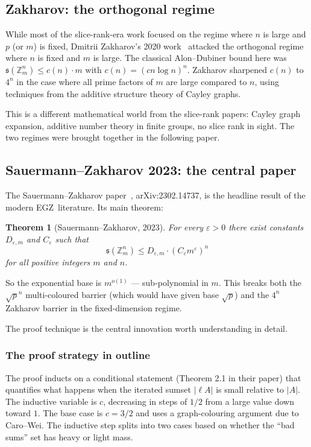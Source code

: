 \documentclass[11pt,a4paper]{article}
\theoremstyle{plain}
\newtheorem{theorem}{Theorem}[section]
\theoremstyle{definition}
\theoremstyle{remark}
\newcommand{\Z}{\mathbb{Z}}
\newcommand{\sUFp}{\mathfrak{s}}
\newcommand{\EGZ}{\textsf{EGZ}}
\begin{document}
\subsection{Zakharov: the orthogonal regime}

While most of the slice-rank-era work focused on the regime where $n$ is large and $p$ (or $m$) is fixed, Dmitrii Zakharov's 2020 work~\cite{zakharov2020} attacked the orthogonal regime where $n$ is fixed and $m$ is large. The classical Alon--Dubiner bound here was $\sUFp(\Z_m^n) \leq c(n) \cdot m$ with $c(n) = (cn \log n)^n$. Zakharov sharpened $c(n)$ to $4^n$ in the case where all prime factors of $m$ are large compared to $n$, using techniques from the additive structure theory of Cayley graphs.

This is a different mathematical world from the slice-rank papers: Cayley graph expansion, additive number theory in finite groups, no slice rank in sight. The two regimes were brought together in the following paper.

\subsection{Sauermann--Zakharov 2023: the central paper}\label{sec:sauermann-zakharov}

The Sauermann--Zakharov paper~\cite{sauermannzakharov2023}, arXiv:2302.14737, is the headline result of the modern \EGZ\ literature. Its main theorem:

\begin{theorem}[Sauermann--Zakharov, 2023]
For every $\varepsilon > 0$ there exist constants $D_{\varepsilon, m}$ and $C_\varepsilon$ such that
\[
\sUFp(\Z_m^n) \leq D_{\varepsilon, m} \cdot (C_\varepsilon m^\varepsilon)^n
\]
for all positive integers $m$ and $n$.
\end{theorem}

So the exponential base is $m^{o(1)}$ --- sub-polynomial in $m$. This breaks both the $\sqrt{p}^n$ multi-coloured barrier (which would have given base $\sqrt{p}$) and the $4^n$ Zakharov barrier in the fixed-dimension regime.

The proof technique is the central innovation worth understanding in detail.

\subsubsection{The proof strategy in outline}

The proof inducts on a conditional statement (Theorem 2.1 in their paper) that quantifies what happens when the iterated sumset $|\ell A|$ is small relative to $|A|$. The inductive variable is $c$, decreasing in steps of $1/2$ from a large value down toward $1$. The base case is $c = 3/2$ and uses a graph-colouring argument due to Caro--Wei. The inductive step splits into two cases based on whether the ``bad sums'' set has heavy or light mass.
\end{document}
